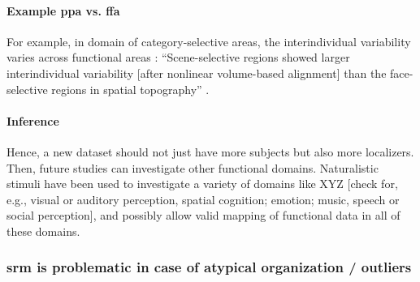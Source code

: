 \paragraph{Example \ac{ppa} vs. \ac{ffa}}
%
For example, in domain of category-selective areas, the interindividual
variability varies across functional areas \citep{zhen2017quantifying,
zhen2015quantifying, frost2012measuring}:
%
``Scene-selective regions showed larger interindividual variability [after
nonlinear volume-based alignment] than the face-selective regions in spatial
topography'' \citep{zhen2017quantifying}.


\paragraph{Inference}




%
Hence, a new dataset should not just have more subjects but also more
localizers.
%
Then, future studies can investigate other functional domains.
%
Naturalistic stimuli have been used to investigate a variety of domains like XYZ
[check for, e.g., visual or auditory perception, spatial cognition; emotion;
music, speech or social perception], and possibly allow valid mapping of
functional data in all of these domains.


\subsubsection{\ac{srm} is problematic in case of atypical organization /
outliers}




